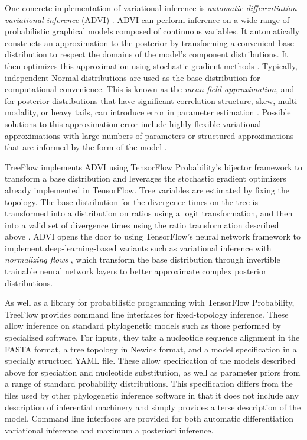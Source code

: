 One concrete implementation of variational inference is \textit{automatic differentiation variational inference} (ADVI) \cite{kucukelbir2017automatic}. ADVI can perform inference on a wide range of probabilistic graphical models composed of continuous variables. It automatically constructs an approximation to the posterior by transforming a convenient base distribution to respect the domains of the model's component distributions. It then optimizes this approximation using stochastic gradient methods \cite{robbins1951stochastic, bottou2010large}. Typically, independent Normal distributions are used as the base distribution for computational convenience. This is known as the \textit{mean field approximation}, and for posterior distributions that have significant correlation-structure, skew, multi-modality, or heavy tails, can introduce error in parameter estimation \cite{blei2017variational}. Possible solutions to this approximation error include highly flexible variational approximations with large numbers of parameters \cite{rezende2015variational} or structured approximations that are informed by the form of the model \cite{ambrogioni2021automatic}.

TreeFlow implements ADVI using TensorFlow Probability's bijector framework to transform a base distribution and leverages the stochastic gradient optimizers already implemented in TensorFlow. Tree variables are estimated by fixing the topology. The base distribution for the divergence times on the tree is transformed into a distribution on ratios using a logit transformation, and then into a valid set of divergence times using the ratio transformation described above \cite{yang2007paml}. ADVI opens the door to using TensorFlow's neural network framework to implement deep-learning-based variants such as variational inference with \textit{normalizing flows} \cite{rezende2015variational}, which transform the base distribution through invertible trainable neural network layers to better approximate complex posterior distributions.

As well as a library for probabilistic programming with TensorFlow Probability, TreeFlow provides command line interfaces for fixed-topology inference. These allow inference on standard phylogenetic models such as those performed by specialized software. For inputs, they take a nucleotide sequence alignment in the FASTA format, a tree topology in Newick format, and a model specification in a specially structued YAML file. These allow specification of the models described above for speciation and nucleotide substitution, as well as parameter priors from a range of standard probability distributions. This specification differs from the files used by other phylogenetic inference software \cite{drummond2007beast, hohna2016revbayes} in that it does not include any description of inferential machinery and simply provides a terse description of the model. Command line interfaces are provided for both automatic differentiation variational inference and maximum a posteriori inference.

